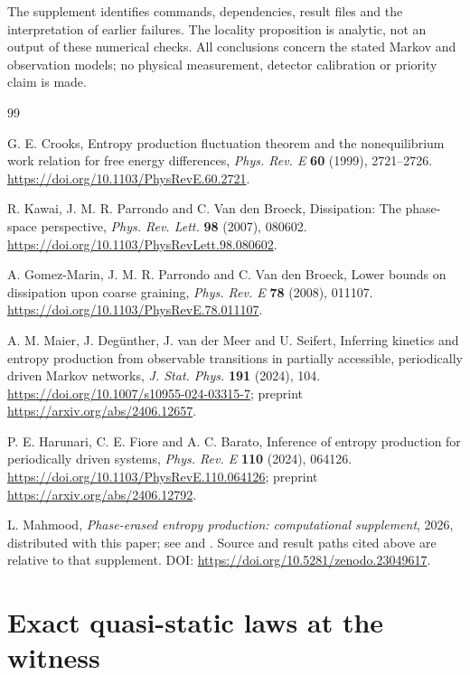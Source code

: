 \documentclass[10pt]{article}
\theoremstyle{definition}
\begin{document}
The supplement \cite{EP1Brecord} identifies commands, dependencies,
result files and the interpretation of earlier failures. The locality
proposition is analytic, not an output of these numerical checks.
All conclusions concern the stated Markov and observation models; no
physical measurement, detector calibration or priority claim is made.


\begin{thebibliography}{99}

G. E. Crooks, Entropy production fluctuation theorem and the
nonequilibrium work relation for free energy differences, \emph{Phys.
Rev. E} \textbf{60} (1999), 2721--2726.
\url{https://doi.org/10.1103/PhysRevE.60.2721}.

R. Kawai, J. M. R. Parrondo and C. Van den Broeck, Dissipation: The
phase-space perspective, \emph{Phys. Rev. Lett.} \textbf{98} (2007),
080602. \url{https://doi.org/10.1103/PhysRevLett.98.080602}.

A. Gomez-Marin, J. M. R. Parrondo and C. Van den Broeck, Lower bounds on
dissipation upon coarse graining, \emph{Phys. Rev. E} \textbf{78} (2008),
011107. \url{https://doi.org/10.1103/PhysRevE.78.011107}.

A. M. Maier, J. Deg\"unther, J. van der Meer and U. Seifert, Inferring
kinetics and entropy production from observable transitions in partially
accessible, periodically driven Markov networks, \emph{J. Stat. Phys.}
\textbf{191} (2024), 104.
\url{https://doi.org/10.1007/s10955-024-03315-7};
preprint \url{https://arxiv.org/abs/2406.12657}.

P. E. Harunari, C. E. Fiore and A. C. Barato, Inference of entropy
production for periodically driven systems, \emph{Phys. Rev. E}
\textbf{110} (2024), 064126.
\url{https://doi.org/10.1103/PhysRevE.110.064126};
preprint \url{https://arxiv.org/abs/2406.12792}.

L. Mahmood, \emph{Phase-erased entropy production: computational supplement},
2026, distributed with this paper; see  and
. Source and result paths cited above are relative
to that supplement. DOI:
\url{https://doi.org/10.5281/zenodo.23049617}.

\end{thebibliography}

\appendix

\section{Exact quasi-static laws at the witness}
\label{app:add1}
\end{document}
